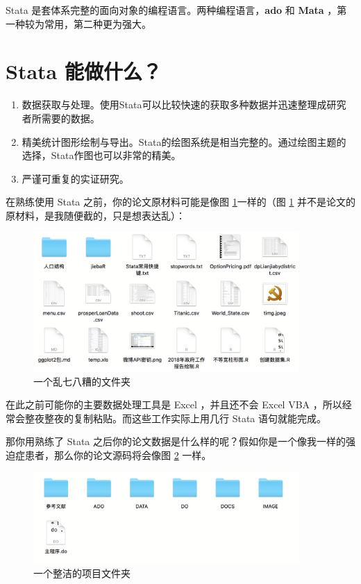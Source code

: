 Stata 是套体系完整的面向对象的编程语言。两种编程语言，\textbf{ado} 和 \textbf{Mata} ，第一种较为常用，第二种更为强大。

\section{Stata 能做什么？}

\begin{enumerate}
\item  数据获取与处理。使用Stata可以比较快速的获取多种数据并迅速整理成研究者所需要的数据。
\item  精美统计图形绘制与导出。Stata的绘图系统是相当完整的。通过绘图主题的选择，Stata作图也可以非常的精美。
\item  严谨可重复的实证研究。
\end{enumerate}

在熟练使用 Stata 之前，你的论文原材料可能是像图 \ref{fig:dirtydir}一样的（图 \ref{fig:dirtydir} 并不是论文的原材料，是我随便截的，只是想表达乱）：

\begin{figure}[htbp]
  \centering \includegraphics[width=0.9\textwidth]{assets/dirtydir.png}
  \caption{一个乱七八糟的文件夹}
  \label{fig:dirtydir}
\end{figure}

在此之前可能你的主要数据处理工具是 Excel ，并且还不会 Excel VBA ，所以经常会整夜整夜的复制粘贴。而这些工作实际上用几行 Stata 语句就能完成。

那你用熟练了 Stata 之后你的论文数据是什么样的呢？假如你是一个像我一样的强迫症患者，那么你的论文源码将会像图 \ref{fig:cleandir} 一样。

\begin{figure}[htbp]
  \centering \includegraphics[width=0.9\textwidth]{assets/cleandir.png}
  \caption{一个整洁的项目文件夹}
  \label{fig:cleandir}
\end{figure}


